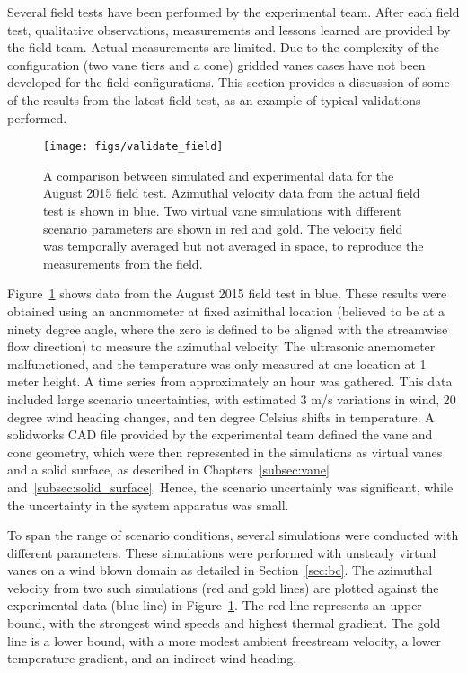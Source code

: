 Several field tests have been performed by the experimental team. After
each field test, qualitative observations, measurements and lessons
learned are provided by the field team. Actual measurements
are limited. Due to the complexity of the configuration
(two vane tiers and a cone) gridded vanes cases have not been developed 
for the field configurations. This section provides a discussion of some of
the results from the latest field test, as an example of typical
validations performed. 

 \begin{figure}[!htb]
  \begin{center}
   \texttt{[image: figs/validate\_field]}
   \caption{A comparison between simulated and experimental data for the
   August 2015 field test. Azimuthal velocity data from the actual field
   test is shown in blue. Two virtual vane simulations with different
   scenario parameters are shown in red and gold. The velocity field was
   temporally averaged but not averaged in space, to reproduce
   the measurements from the field.}
   \label{fig:field_val}
  \end{center}
 \end{figure}
%
%

Figure~\ref{fig:field_val} shows data from the August 2015 field test in
blue. These results were obtained using an anonmometer at fixed
azimithal location (believed to be at a ninety degree angle, where the zero
is defined to be aligned with the streamwise flow direction) to measure the
azimuthal velocity. The ultrasonic anemometer malfunctioned, and the
temperature was only measured at one location at 1 meter height. A time
series from approximately an hour was gathered. This data included large
scenario uncertainties, with estimated 3 m/s variations in wind, 20
degree wind heading changes, and ten degree Celsius shifts in
temperature. A solidworks CAD file provided by the experimental team
defined the vane and cone geometry, which were then represented in the
simulations as virtual vanes and a solid surface, as described in 
Chapters~\ref{subsec:vane} and~\ref{subsec:solid_surface}. Hence, the
scenario uncertainly was significant, while the uncertainty in the
system apparatus was small. 

To span the range of scenario conditions, several simulations were conducted
with different parameters. These simulations were performed with
unsteady virtual vanes on a wind blown domain as detailed in
Section~\ref{sec:bc}.  The azimuthal velocity from two such
simulations (red and gold lines) are plotted against the experimental
data (blue line) in Figure~\ref{fig:field_val}. The red line represents
an upper bound, with the strongest wind speeds and highest thermal
gradient. The gold line is a lower bound, with a more modest ambient
freestream velocity, a lower temperature gradient, and an indirect wind
heading. 

